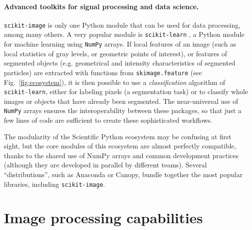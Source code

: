 \documentclass[twocolumn]{bmcart}%
\begin{document}
\paragraph{Advanced toolkits for signal processing and data science.}

\texttt{scikit-image} is only one Python module that can be used for data
processing, among many others. A very popular module is
\texttt{scikit-learn} \citep{Pedregosa2011}, a Python module for machine
learning using \texttt{NumPy} arrays. If local features of an image
(such as local statistics of gray levels, or geometric points of
interest), or features of segmented objects (e.g. geometrical and
intensity characteristics of segmented particles) are extracted with
functions from \texttt{skimage.feature} (see Fig.~\ref{fig:ecosystem}), it
is then possible to use a \emph{classification} algorithm of
\texttt{scikit-learn}, either for labeling pixels (a segmentation task)
or to classify whole images or objects that have already been segmented.
The near-universal use of \texttt{NumPy} arrays ensures the interoperability
between these packages, so that just a few lines of code are sufficient
to create these sophisticated workflows.

The modularity of the Scientific Python ecosystem may be
confusing at first sight, but the core modules of this ecosystem
are almost perfectly compatible, thanks to the shared use of NumPy arrays
and common development practices (although they are developed in parallel
by different teams). Several ``distributions'', such as Anaconda
or Canopy, bundle together the most popular libraries, including
\texttt{scikit-image}.

\section*{Image processing capabilities}
\end{document}

